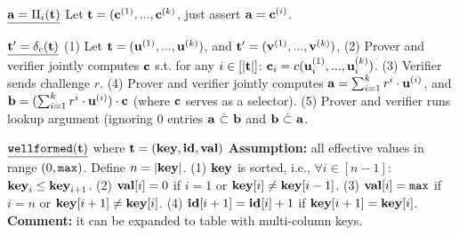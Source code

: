 \begin{small}
\begin{algorithm}[bt]
$\underline{{{\mathbf {a}}} = \Pi_{i}({{\mathbf {t}}})}$ \newline
 Let ${{\mathbf {t}}} = ({{\mathbf {c}}}^{(1)}, ..., {{\mathbf {c}}}^{(k)}$, just
 assert ${{\mathbf {a}}} = {{\mathbf {c}}}^{(i)}$. \newline

$\underline{{{\mathbf {t}}}' = \delta_{c}({{\mathbf {t}}})}$ \newline
 (1) Let ${{\mathbf {t}}} = ({{\mathbf {u}}}^{(1)}, ..., {{\mathbf {u}}}^{(k)})$, 
 	 and ${{\mathbf {t}}}' = ({{\mathbf {v}}}^{(1)}, ..., {{\mathbf {v}}}^{(k)})$, 
 \newline
 (2) Prover and verifier jointly
 	computes ${{\mathbf {c}}}$ s.t. for any $i\in [|{{\mathbf {t}}}|]$:
 	${{\mathbf {c}}}_i = c({{\mathbf {u}}}^{(1)}_i, ..., {{\mathbf {u}}}^{(k)}_i)$. \newline
 (3) Verifier sends challenge $r$. \newline
 (4) Prover and verifier jointly computes
 	${{\mathbf {a}}} = \sum_{i=1}^k r^i \cdot {{\mathbf {u}}}^{(i)}$, and
 	${{\mathbf {b}}} = (\sum_{i=1}^k r^i \cdot {{\mathbf {u}}}^{(i)}) \cdot {{\mathbf {c}}}$
	(where ${{\mathbf {c}}}$ serves as a selector). \newline
 (5) Prover and verifier runs lookup argument (ignoring $0$ entries
 	${{\mathbf {a}}} ~\hat{\subset}~ {{\mathbf {b}}}$ and
	${{\mathbf {b}}} ~\hat{\subset}~ {{\mathbf {a}}}$. 

$\underline{{\tt wellformed}({{\mathbf {t}}})}$ where ${{\mathbf {t}}}= ({{\mathbf {key}}}, {{\mathbf {id}}}, {{\mathbf {val}}})$
	\newline
  {\bf Assumption: } all effective values in range $(0,{\tt max})$.
  	Define $n = |{{\mathbf {key}}}|$. \newline
  (1) ${{\mathbf {key}}}$ is sorted, i.e.,
  	$\forall i\in[n-1]$: ${{\mathbf {key}}}_i \leq {{\mathbf {key}}}_{i+1}$. \newline
  (2) ${{\mathbf {val}}}[i]=0$ if $i=1$ or ${{\mathbf {key}}}[i]\neq {{\mathbf {key}}}[i-1]$. \newline
  (3) ${{\mathbf {val}}}[i]={\tt max}$ if $i=n$ or ${{\mathbf {key}}}[i+1]\neq {{\mathbf {key}}}[i]$. \newline
  (4) ${{\mathbf {id}}}[i+1] = {{\mathbf {id}}}[i] + 1$ 
  	if ${{\mathbf {key}}}[i+1]={{\mathbf {key}}}[i]$.
		\newline
  {\bf Comment:} it can be expanded to table with multi-column keys.


\end{algorithm}
\end{small}
